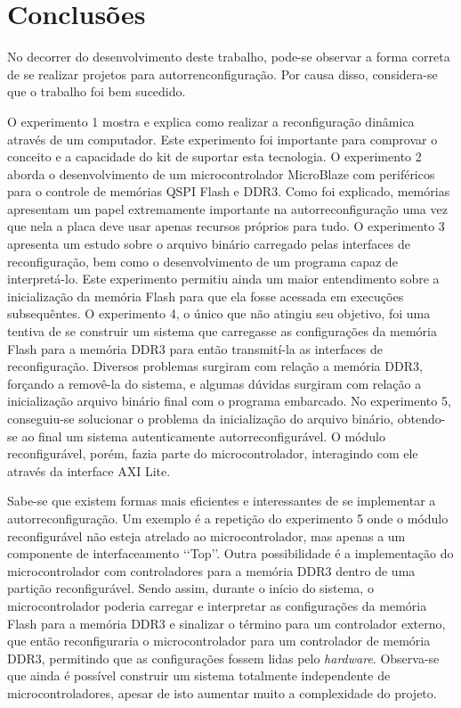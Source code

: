 ﻿%
                      

\chapter{Conclus\~{o}es}\label{CapConclusoes}
No decorrer do desenvolvimento deste trabalho, pode-se observar a forma correta de se realizar projetos para autorrenconfiguração.
Por causa disso, considera-se que o trabalho foi bem sucedido.

O experimento 1 mostra e explica como realizar a reconfiguração dinâmica através de um computador.
Este experimento foi importante para comprovar o conceito e a capacidade do kit de suportar esta tecnologia.
O experimento 2 aborda o desenvolvimento de um microcontrolador MicroBlaze com periféricos para o controle de memórias QSPI Flash e DDR3.
Como foi explicado, memórias apresentam um papel extremamente importante na autorreconfiguração uma vez que nela a placa deve usar apenas recursos próprios para tudo.
O experimento 3 apresenta um estudo sobre o arquivo binário carregado pelas interfaces de reconfiguração, bem como o desenvolvimento de um programa capaz de interpretá-lo.
Este experimento permitiu ainda um maior entendimento sobre a inicialização da memória Flash para que ela fosse acessada em execuções subsequêntes.
O experimento 4, o único que não atingiu seu objetivo, foi uma tentiva de se construir um sistema que carregasse as configurações da memória Flash para a memória DDR3 para então transmití-la as interfaces de reconfiguração.
Diversos problemas surgiram com relação a memória DDR3, forçando a removê-la do sistema, e algumas dúvidas surgiram com relação a inicialização arquivo binário final com o programa embarcado.
No experimento 5, conseguiu-se solucionar o problema da inicialização do arquivo binário, obtendo-se ao final um sistema autenticamente autorreconfigurável.
O módulo reconfigurável, porém, fazia parte do microcontrolador, interagindo com ele através da interface AXI Lite.

Sabe-se que existem formas mais eficientes e interessantes de se implementar a autorreconfiguração.
Um exemplo é a repetição do experimento 5 onde o módulo reconfigurável não esteja atrelado ao microcontrolador, mas apenas a um componente de interfaceamento \lq\lq{}Top\rq\rq{}.
Outra possibilidade é a implementação do microcontrolador com controladores para a memória DDR3 dentro de uma partição reconfigurável.
Sendo assim, durante o início do sistema, o microcontrolador poderia carregar e interpretar as configurações da memória Flash para a memória DDR3 e sinalizar o término para um controlador externo, que então reconfiguraria o microcontrolador para um controlador de memória DDR3, permitindo que as configurações fossem lidas pelo \textit{hardware}.
Observa-se que ainda é possível construir um sistema totalmente independente de microcontroladores, apesar de isto aumentar muito a complexidade do projeto.